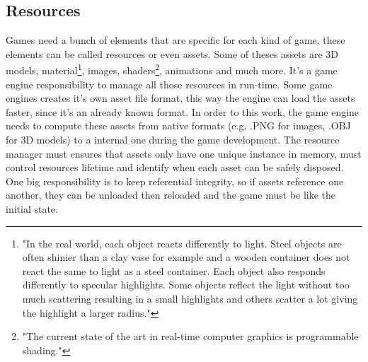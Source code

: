 \subsection{Resources}
Games need a bunch of elements that are specific for each kind of game, these elements can be called resources or even assets. Some of theses assets are 3D models, material\footnote{"In the real world, each object reacts differently to light. Steel objects are often shinier than a clay vase for example and a wooden container does not react the same to light as a steel container. Each object also responds differently to specular highlights. Some objects reflect the light without too much scattering resulting in a small highlights and others scatter a lot giving the highlight a larger radius."\cite{LearnOpenGL}}, images, shaders\footnote{"The current state of the art in real-time computer graphics is programmable shading."\cite{OpenGLBible}}, animations and much more\cite{UnityResources}. It's a game engine responsibility to manage all those resources in run-time. Some game engines creates it's own asset file format, this way the engine can load the assets faster, since it's an already known format. In order to this work, the game engine needs to compute these assets from native formats (e.g. .PNG for images, .OBJ for 3D models) to a internal one during the game development. The resource manager must ensures that assets only have one unique instance in memory, must control resources lifetime and identify when each asset can be safely disposed. One big responsibility is to keep referential integrity, so if assets reference one another, they can be unloaded then reloaded and the game must be like the initial state\cite{GameEngineArchitecture}.